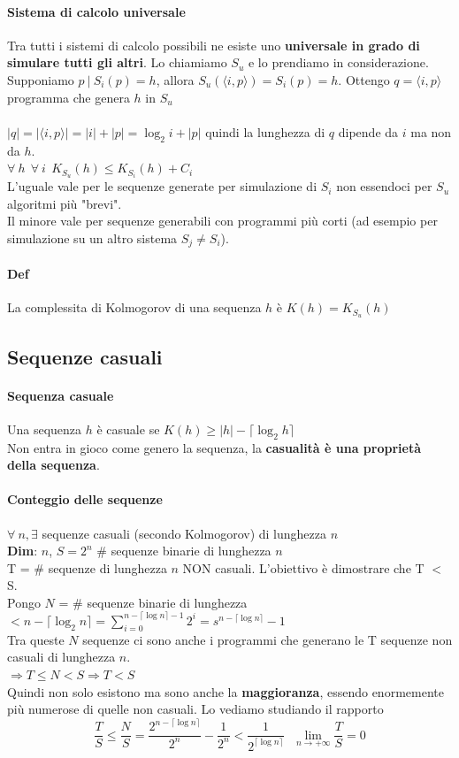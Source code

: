 \documentclass[10pt]{book}
\begin{document}
\paragraph{Sistema di calcolo universale} Tra tutti i sistemi di calcolo possibili ne esiste uno \textbf{universale in grado di simulare tutti gli altri}. Lo chiamiamo $S_u$ e lo prendiamo in considerazione.\\
Supponiamo $p\:|\:S_i(p) = h$, allora $S_u(\langle i, p\rangle) = S_i(p) = h$. Ottengo $q = \langle i, p\rangle$ programma che genera $h$ in $S_u$\\\\
$|q| = |\langle i,p\rangle| = |i| + |p| = \log_2 i + |p|$ quindi la lunghezza di $q$ dipende da $i$ ma non da $h$.\\
$\forall\:h\:\:\forall\: i\:\:K_{S_u}(h) \leq K_{S_i}(h) + C_i$\\
L'uguale vale per le sequenze generate per simulazione di $S_i$ non essendoci per $S_u$ algoritmi più "brevi".\\Il minore vale per sequenze generabili con programmi più corti (ad esempio per simulazione su un altro sistema $S_j\neq S_i$).
\paragraph{Def} La complessita di Kolmogorov di una sequenza $h$ è $K(h) = K_{S_u}(h)$
\subsection{Sequenze casuali}
\paragraph{Sequenza casuale} Una sequenza $h$ è casuale se $K(h) \geq |h| - \lceil\log_2 h\rceil$\\
Non entra in gioco come genero la sequenza, la \textbf{casualità è una proprietà della sequenza}.
\paragraph{Conteggio delle sequenze} $\forall\: n, \exists$ sequenze casuali (secondo Kolmogorov) di lunghezza $n$\\
\textbf{Dim}: $n$, $S = 2^n$ \# sequenze binarie di lunghezza $n$\\
T = \# sequenze di lunghezza $n$ NON casuali. L'obiettivo è dimostrare che T $<$ S.\\
Pongo $N$ = \# sequenze binarie di lunghezza $< n - \lceil \log_2 n\rceil = \sum_{i=0}^{n-\lceil \log n\rceil - 1} 2^i = s^{n-\lceil \log n\rceil} - 1$\\
Tra queste $N$ sequenze ci sono anche i programmi che generano le T sequenze non casuali di lunghezza $n$.\\
$\Rightarrow T\leq N < S \Rightarrow T < S$\\
Quindi non solo esistono ma sono anche la \textbf{maggioranza}, essendo enormemente più numerose di quelle non casuali. Lo vediamo studiando il rapporto $$\frac{T}{S}\leq \frac{N}{S} = \frac{2^{n - \lceil\log n\rceil}}{2^n} - \frac{1}{2^n} < \frac{1}{2^{\lceil\log n\rceil}}\:\:\:\lim_{n\to +\infty} \frac{T}{S} = 0$$
\end{document}
